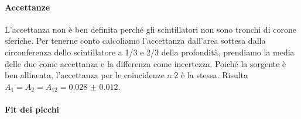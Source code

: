\paragraph{Accettanze}

L'accettanza non è ben definita perché gli scintillatori non sono tronchi di corone sferiche.
Per tenerne conto calcoliamo l'accettanza dall'area sottesa dalla circonferenza dello scintillatore
a 1/3 e 2/3 della profondità, prendiamo la media delle due come accettanza e la differenza come incertezza.
Poiché la sorgente è ben allineata, l'accettanza per le coincidenze a 2 è la stessa.
Risulta $A_1 = A_2 = A_{12} = \num{0.028(12)}$.

\paragraph{Fit dei picchi}


